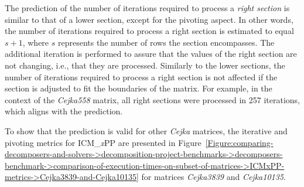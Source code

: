 The prediction of the number of iterations required to process a \textit{right section} is similar to that of a lower section, except for the pivoting aspect. In other words, the number of iterations required to process a right section is estimated to equal $s + 1$, where $s$ represents the number of rows the section encompasses. The additional iteration is performed to assure that the values of the right section are not changing, i.e., that they are processed. Similarly to the lower sections, the number of iterations required to process a right section is not affected if the section is adjusted to fit the boundaries of the matrix. For example, in the context of the \textit{Cejka558} matrix, all right sections were processed in 257 iterations, which aligns with the prediction.

To show that the prediction is valid for other \textit{Cejka} matrices, the iterative and pivoting metrics for ICM\_\textit{x}PP are presented in Figure~\ref{Figure:comparing-decomposers-and-solvers->decomposition-project-benchmarks->decomposers-benchmark->comparison-of-execution-times-on-subset-of-matrices->ICMxPP-metrics->Cejka3839-and-Cejka10135} for matrices \textit{Cejka3839} and \textit{Cejka10135}.

